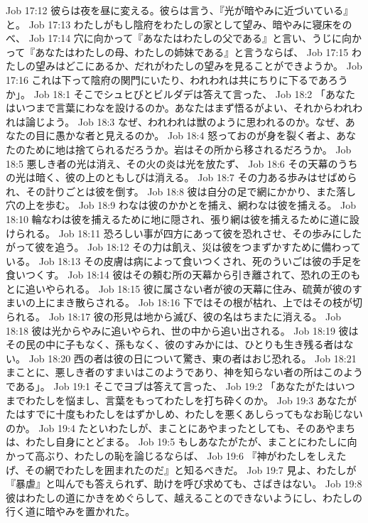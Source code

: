 Job 17:12  彼らは夜を昼に変える。彼らは言う、『光が暗やみに近づいている』と。
Job 17:13  わたしがもし陰府をわたしの家として望み、暗やみに寝床をのべ、
Job 17:14  穴に向かって『あなたはわたしの父である』と言い、うじに向かって『あなたはわたしの母、わたしの姉妹である』と言うならば、
Job 17:15  わたしの望みはどこにあるか、だれがわたしの望みを見ることができようか。
Job 17:16  これは下って陰府の関門にいたり、われわれは共にちりに下るであろうか」。
Job 18:1  そこでシュヒびとビルダデは答えて言った、
Job 18:2  「あなたはいつまで言葉にわなを設けるのか。あなたはまず悟るがよい、それからわれわれは論じよう。
Job 18:3  なぜ、われわれは獣のように思われるのか。なぜ、あなたの目に愚かな者と見えるのか。
Job 18:4  怒っておのが身を裂く者よ、あなたのために地は捨てられるだろうか。岩はその所から移されるだろうか。
Job 18:5  悪しき者の光は消え、その火の炎は光を放たず、
Job 18:6  その天幕のうちの光は暗く、彼の上のともしびは消える。
Job 18:7  その力ある歩みはせばめられ、その計りごとは彼を倒す。
Job 18:8  彼は自分の足で網にかかり、また落し穴の上を歩む。
Job 18:9  わなは彼のかかとを捕え、網わなは彼を捕える。
Job 18:10  輪なわは彼を捕えるために地に隠され、張り網は彼を捕えるために道に設けられる。
Job 18:11  恐ろしい事が四方にあって彼を恐れさせ、その歩みにしたがって彼を追う。
Job 18:12  その力は飢え、災は彼をつまずかすために備わっている。
Job 18:13  その皮膚は病によって食いつくされ、死のういごは彼の手足を食いつくす。
Job 18:14  彼はその頼む所の天幕から引き離されて、恐れの王のもとに追いやられる。
Job 18:15  彼に属さない者が彼の天幕に住み、硫黄が彼のすまいの上にまき散らされる。
Job 18:16  下ではその根が枯れ、上ではその枝が切られる。
Job 18:17  彼の形見は地から滅び、彼の名はちまたに消える。
Job 18:18  彼は光からやみに追いやられ、世の中から追い出される。
Job 18:19  彼はその民の中に子もなく、孫もなく、彼のすみかには、ひとりも生き残る者はない。
Job 18:20  西の者は彼の日について驚き、東の者はおじ恐れる。
Job 18:21  まことに、悪しき者のすまいはこのようであり、神を知らない者の所はこのようである」。
Job 19:1  そこでヨブは答えて言った、
Job 19:2  「あなたがたはいつまでわたしを悩まし、言葉をもってわたしを打ち砕くのか。
Job 19:3  あなたがたはすでに十度もわたしをはずかしめ、わたしを悪くあしらってもなお恥じないのか。
Job 19:4  たといわたしが、まことにあやまったとしても、そのあやまちは、わたし自身にとどまる。
Job 19:5  もしあなたがたが、まことにわたしに向かって高ぶり、わたしの恥を論じるならば、
Job 19:6  『神がわたしをしえたげ、その網でわたしを囲まれたのだ』と知るべきだ。
Job 19:7  見よ、わたしが『暴虐』と叫んでも答えられず、助けを呼び求めても、さばきはない。
Job 19:8  彼はわたしの道にかきをめぐらして、越えることのできないようにし、わたしの行く道に暗やみを置かれた。

